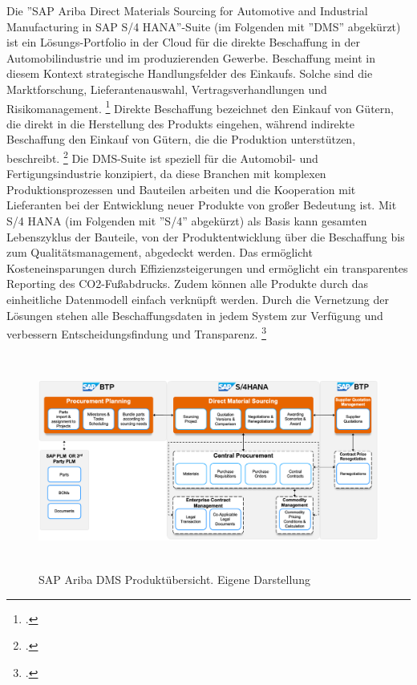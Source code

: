 Die ''SAP Ariba Direct Materials Sourcing for Automotive and Industrial Manufacturing in SAP S/4 HANA''-Suite (im Folgenden mit ''DMS'' abgekürzt) ist ein Lösungs-Portfolio in der Cloud für die direkte Beschaffung in der Automobilindustrie und im produzierenden Gewerbe. Beschaffung meint in diesem Kontext strategische Handlungsfelder des Einkaufs. Solche sind \zB die Marktforschung, Lieferantenauswahl, Vertragsverhandlungen und Risikomanagement. \footcite[Vgl.][S. 541]{theorie_digitale_transformation_beschaffung_automobilindustrie_2019} Direkte Beschaffung bezeichnet den Einkauf von Gütern, die direkt in die Herstellung des Produkts eingehen, während indirekte Beschaffung den Einkauf von Gütern, die die Produktion unterstützen, beschreibt. \footcite[Vgl.][S. 541]{theorie_digitale_transformation_beschaffung_automobilindustrie_2019} Die DMS-Suite ist speziell für die Automobil- und Fertigungsindustrie konzipiert, da diese Branchen mit komplexen Produktionsprozessen und Bauteilen arbeiten und die Kooperation mit Lieferanten bei der Entwicklung neuer Produkte von gro\ss er Bedeutung ist. Mit S/4 HANA (im Folgenden mit ''S/4'' abgekürzt) als Basis kann gesamten Lebenszyklus der Bauteile, von der Produktentwicklung über die Beschaffung bis zum Qualitätsmanagement, abgedeckt werden. Das ermöglicht Kosteneinsparungen durch Effizienzsteigerungen und ermöglicht ein transparentes Reporting des CO2-Fu\ss abdrucks. Zudem können alle Produkte durch das einheitliche Datenmodell einfach verknüpft werden. Durch die Vernetzung der Lösungen stehen alle Beschaffungsdaten in jedem System zur Verfügung und verbessern Entscheidungsfindung und Transparenz. \footcite[Vgl.][]{theorie_sap_webseite_dms_übersicht_2024}

\begin{figure}[H]
    \centering
    \includegraphics[height=7.09cm]{Bilder/Direct_Material_Sourcing_Overview3.png}
    \caption[SAP Ariba DMS Suite Produktübersicht]{SAP Ariba DMS Produktübersicht. Eigene Darstellung}
    \label{fig:Direct_Material_Sourcing_Overview3}
\end{figure}

